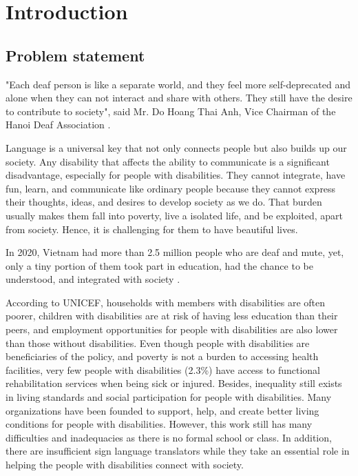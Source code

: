 \chapter{Introduction}
	
\section{Problem statement}

"Each deaf person is like a separate world, and they feel more self-deprecated and alone when they can not interact and share with others. They still have the desire to contribute to society", said Mr. Do Hoang Thai Anh, Vice Chairman of the Hanoi Deaf Association \cite{MoCanhCuaHyVong}.

Language is a universal key that not only connects people but also builds up our society. Any disability that affects the ability to communicate is a significant disadvantage, especially for people with disabilities. They cannot integrate, have fun, learn, and communicate like ordinary people because they cannot express their thoughts, ideas, and desires to develop society as we do. That burden usually makes them fall into poverty, live a isolated life, and be exploited, apart from society. Hence, it is challenging for them to have beautiful lives.

In 2020, Vietnam had more than 2.5 million people who are deaf and mute, yet, only a tiny portion of them took part in education, had the chance to be understood, and integrated with society \cite{ThieuPhienDich}.

According to UNICEF, households with members with disabilities are often poorer, children with disabilities are at risk of having less education than their peers, and employment opportunities for people with disabilities are also lower than those without disabilities. Even though people with disabilities are beneficiaries of the policy, and poverty is not a burden to accessing health facilities, very few people with disabilities (2.3\%) have access to functional rehabilitation services when being sick or injured. Besides, inequality still exists in living standards and social participation for people with disabilities. Many organizations have been founded to support, help, and create better living conditions for people with disabilities. However, this work still has many difficulties and inadequacies as there is no formal school or class. In addition, there are insufficient sign language translators while they take an essential role in helping the people with disabilities connect with society.

